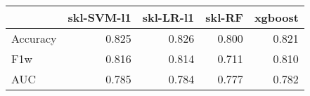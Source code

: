 \begin{tabular}{lrrrr}
\toprule
{} &  skl-SVM-l1 &  skl-LR-l1 &  skl-RF &  xgboost \\
\midrule
Accuracy &       0.825 &      0.826 &   0.800 &    0.821 \\
F1w      &       0.816 &      0.814 &   0.711 &    0.810 \\
AUC      &       0.785 &      0.784 &   0.777 &    0.782 \\
\bottomrule
\end{tabular}

